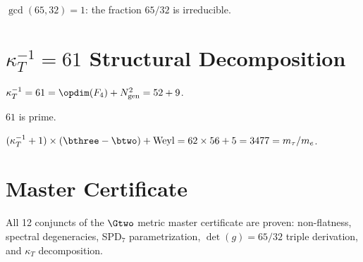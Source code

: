 \begin{theorem}[Irreducibility]\label{thm:detg_irred}
    \leanok
    $\gcd(65, 32) = 1$: the fraction $65/32$ is irreducible.
\end{theorem}

\section{\texorpdfstring{$\kappa_T^{-1} = 61$}{kappa\_T\^{}-1 = 61} Structural Decomposition}

\begin{theorem}\label{thm:kappa_F4}
    \leanok
    $\kappa_T^{-1} = 61 = \opdim(F_4) + N_{\mathrm{gen}}^2 = 52 + 9$.
\end{theorem}

\begin{theorem}\label{thm:kappa_prime}
    \leanok
    $61$ is prime.
\end{theorem}

\begin{theorem}\label{thm:kappa_to_tau}
    \leanok
    $(\kappa_T^{-1} + 1) \times (\bthree - \btwo) + \mathrm{Weyl}
    = 62 \times 56 + 5 = 3477 = m_\tau/m_e$.
\end{theorem}

\section{Master Certificate}

\begin{theorem}\label{thm:g2_metric_cert}
    \leanok
    All 12 conjuncts of the $\Gtwo$ metric master certificate are proven:
    non-flatness, spectral degeneracies, SPD$_7$ parametrization,
    $\det(g) = 65/32$ triple derivation, and $\kappa_T$ decomposition.
\end{theorem}

